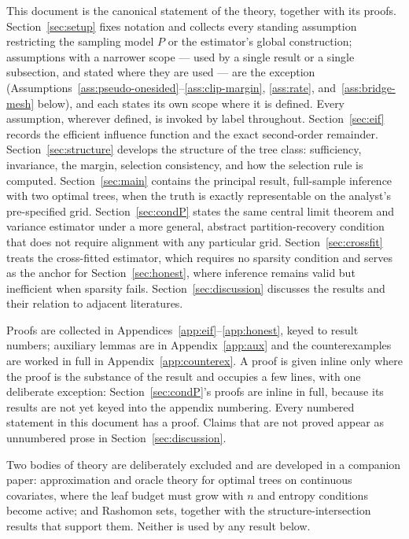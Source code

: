 \documentclass[11pt]{article}
\theoremstyle{plain}
\theoremstyle{definition}
\theoremstyle{remark}
\begin{document}
This document is the canonical statement of the theory, together with its
proofs. Section~\ref{sec:setup} fixes notation and collects every standing
assumption restricting the sampling model $P$ or the estimator's global
construction; assumptions with a narrower scope --- used by a single result or
a single subsection, and stated where they are used --- are the exception
(Assumptions~\ref{ass:pseudo-onesided}--\ref{ass:clip-margin}, \ref{ass:rate},
and~\ref{ass:bridge-mesh} below), and each states its own scope where it is
defined.
Every assumption, wherever defined, is invoked by
label throughout. Section~\ref{sec:eif} records the efficient influence function
and the exact second-order remainder. Section~\ref{sec:structure} develops the
structure of the tree class: sufficiency, invariance, the margin, selection
consistency, and how the selection rule is computed. Section~\ref{sec:main} contains the principal result, full-sample
inference with two optimal trees, when the truth is exactly representable on
the analyst's pre-specified grid. Section~\ref{sec:condP} states the same
central limit theorem and variance estimator under a more general, abstract
partition-recovery condition that does not require alignment with any
particular grid. Section~\ref{sec:crossfit} treats the
cross-fitted estimator, which requires no sparsity condition and serves as the
anchor for Section~\ref{sec:honest}, where inference remains valid but
inefficient when sparsity fails. Section~\ref{sec:discussion} discusses the
results and their relation to adjacent literatures.

Proofs are collected in Appendices~\ref{app:eif}--\ref{app:honest}, keyed to
result numbers; auxiliary lemmas are in Appendix~\ref{app:aux} and the
counterexamples are worked in full in Appendix~\ref{app:counterex}. A proof is
given inline only where the proof is the substance of the result and occupies a
few lines, with one deliberate exception: Section~\ref{sec:condP}'s proofs
are inline in full, because its results are not yet keyed into the appendix
numbering. Every numbered
statement in this document has a proof. Claims that
are not proved appear as unnumbered prose in Section~\ref{sec:discussion}.

Two bodies of theory are deliberately excluded and are developed in a companion
paper: approximation and oracle theory for optimal trees on continuous
covariates, where the leaf budget must grow with $n$ and entropy conditions
become active; and Rashomon sets, together with the structure-intersection
results that support them. Neither is used by any result below.
\end{document}

